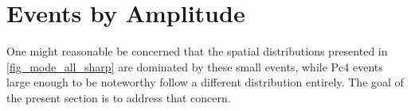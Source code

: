 





\section{Events by Amplitude}
  \label{sec_amp}

One might reasonable be concerned that the spatial distributions presented in \cref{fig_mode_all_sharp} are dominated by these small events, while Pc4 events large enough to be noteworthy follow a different distribution entirely. The goal of the present section is to address that concern. 

